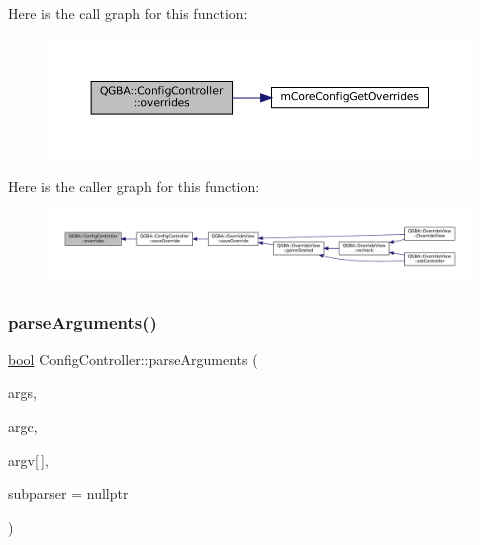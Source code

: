 Here is the call graph for this function\+:
\nopagebreak
\begin{figure}[H]
\begin{center}
\leavevmode
\includegraphics[width=350pt]{class_q_g_b_a_1_1_config_controller_a3a1e6f7263f15d8cfc4af1f1793b0aac_cgraph}
\end{center}
\end{figure}
Here is the caller graph for this function\+:
\nopagebreak
\begin{figure}[H]
\begin{center}
\leavevmode
\includegraphics[width=350pt]{class_q_g_b_a_1_1_config_controller_a3a1e6f7263f15d8cfc4af1f1793b0aac_icgraph}
\end{center}
\end{figure}
\mbox{\label{class_q_g_b_a_1_1_config_controller_a5a1bc56dda151c14559105f1da5af88b}} 
\subsubsection{\texorpdfstring{parse\+Arguments()}{parseArguments()}}
{\footnotesize\ttfamily \mbox{\hyperlink{libretro_8h_a4a26dcae73fb7e1528214a068aca317e}{bool}} Config\+Controller\+::parse\+Arguments (\begin{DoxyParamCaption}\item[{m\+Arguments $\ast$}]{args,  }\item[{\mbox{\hyperlink{ioapi_8h_a787fa3cf048117ba7123753c1e74fcd6}{int}}}]{argc,  }\item[{char $\ast$}]{argv\mbox{[}$\,$\mbox{]},  }\item[{m\+Sub\+Parser $\ast$}]{subparser = {\ttfamily nullptr} }\end{DoxyParamCaption})}

